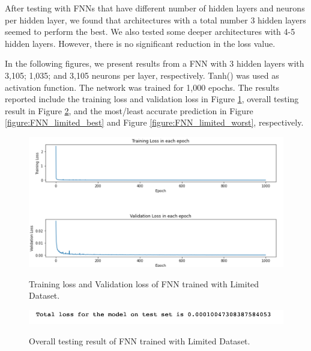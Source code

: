 After testing with FNNs that have different number of hidden layers and neurons per hidden layer, we found that architectures with a total number 3 hidden layers seemed to perform the best. We also tested some deeper architectures with 4-5 hidden layers. However, there is no significant reduction in the loss value.

In the following figures, we present results from a FNN with 3 hidden layers with 3,105; 1,035; and 3,105 neurons per layer, respectively. Tanh() was used as activation function. The network was trained for 1,000 epochs. The results reported include the training loss and validation loss in Figure \ref{figure:FNN_limited_losses}, overall testing result in Figure \ref{figure:FNN_limited_testing}, and the most/least accurate prediction in Figure \ref{figure:FNN_limited_best} and Figure \ref{figure:FNN_limited_worst}, respectively.

\begin{figure}[H]
    \caption{Training loss and Validation loss of FNN trained with Limited Dataset.}
    \includegraphics[scale=0.6]{figures/mantle_convection_images/limited_dataset/FNN_trainingData.png}
    \label{figure:FNN_limited_losses}
\end{figure}

\begin{figure}[H]
    \caption{Overall testing result of FNN trained with Limited Dataset.}
    \includegraphics[scale=0.8]{figures/mantle_convection_images/limited_dataset/FNN_OverallTesting.png}
    \label{figure:FNN_limited_testing}
\end{figure}


